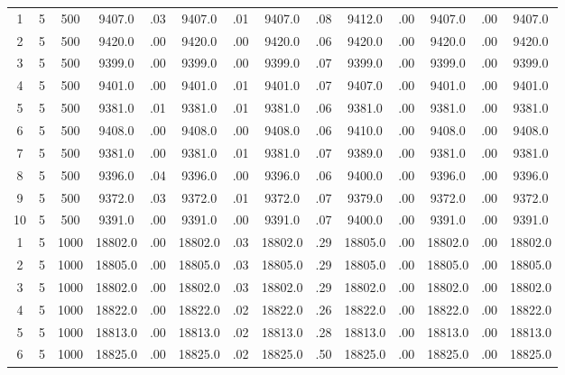 \documentclass[12pt,a4paper]{article}
\begin{document}
\begin{center}
{\begin{tabular}{|ccc|cc|cc|cc|cc|cc|c|}
1             &   5& 500&   9407.0&  .03&   9407.0&  .01&   9407.0&  .08&   9412.0&  .00&   9407.0&  .00&   9407.0\\[-0.01in]
2             &   5& 500&   9420.0&  .00&   9420.0&  .00&   9420.0&  .06&   9420.0&  .00&   9420.0&  .00&   9420.0\\[-0.01in]
3             &   5& 500&   9399.0&  .00&   9399.0&  .00&   9399.0&  .07&   9399.0&  .00&   9399.0&  .00&   9399.0\\[-0.01in]
4             &   5& 500&   9401.0&  .00&   9401.0&  .01&   9401.0&  .07&   9407.0&  .00&   9401.0&  .00&   9401.0\\[-0.01in]
5             &   5& 500&   9381.0&  .01&   9381.0&  .01&   9381.0&  .06&   9381.0&  .00&   9381.0&  .00&   9381.0\\[-0.01in]
6             &   5& 500&   9408.0&  .00&   9408.0&  .00&   9408.0&  .06&   9410.0&  .00&   9408.0&  .00&   9408.0\\[-0.01in]
7             &   5& 500&   9381.0&  .00&   9381.0&  .01&   9381.0&  .07&   9389.0&  .00&   9381.0&  .00&   9381.0\\[-0.01in]
8             &   5& 500&   9396.0&  .04&   9396.0&  .00&   9396.0&  .06&   9400.0&  .00&   9396.0&  .00&   9396.0\\[-0.01in]
9             &   5& 500&   9372.0&  .03&   9372.0&  .01&   9372.0&  .07&   9379.0&  .00&   9372.0&  .00&   9372.0\\[-0.01in]
10            &   5& 500&   9391.0&  .00&   9391.0&  .00&   9391.0&  .07&   9400.0&  .00&   9391.0&  .00&   9391.0\\[-0.01in]
1             &   5&1000&  18802.0&  .00&  18802.0&  .03&  18802.0&  .29&  18805.0&  .00&  18802.0&  .00&  18802.0\\[-0.01in]
2             &   5&1000&  18805.0&  .00&  18805.0&  .03&  18805.0&  .29&  18805.0&  .00&  18805.0&  .00&  18805.0\\[-0.01in]
3             &   5&1000&  18802.0&  .00&  18802.0&  .03&  18802.0&  .29&  18802.0&  .00&  18802.0&  .00&  18802.0\\[-0.01in]
4             &   5&1000&  18822.0&  .00&  18822.0&  .02&  18822.0&  .26&  18822.0&  .00&  18822.0&  .00&  18822.0\\[-0.01in]
5             &   5&1000&  18813.0&  .00&  18813.0&  .02&  18813.0&  .28&  18813.0&  .00&  18813.0&  .00&  18813.0\\[-0.01in]
6             &   5&1000&  18825.0&  .00&  18825.0&  .02&  18825.0&  .50&  18825.0&  .00&  18825.0&  .00&  18825.0\\[-0.01in]

\end{tabular}}
\end{center}
\end{document}
